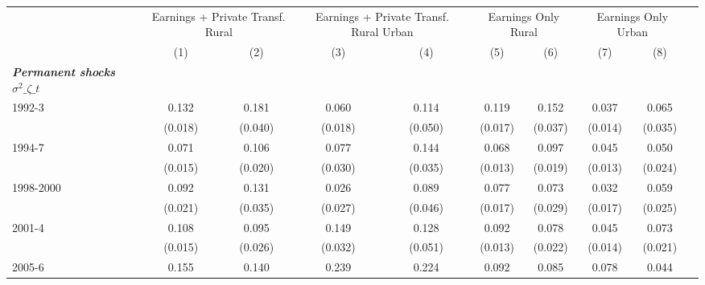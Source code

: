 \begin{tabular}{l*{10}{c}} \toprule
                    &            &\multicolumn{2}{c}{Earnings + Private Transf. Rural}&\multicolumn{2}{c}{Earnings + Private Transf. Rural Urban}&\multicolumn{2}{c}{Earnings Only Rural}&\multicolumn{2}{c}{Earnings Only Urban}\\\cmidrule{3-4}\cmidrule{5-6}\cmidrule{7-8}\cmidrule{9-10}
                    &            &\multicolumn{1}{c}{(1)}&\multicolumn{1}{c}{(2)}&\multicolumn{1}{c}{(3)}&\multicolumn{1}{c}{(4)}&\multicolumn{1}{c}{(5)}&\multicolumn{1}{c}{(6)}&\multicolumn{1}{c}{(7)}&\multicolumn{1}{c}{(8)}\\
\midrule
\textbf{\emph{Permanent shocks $\sigma^2\_{\zeta\_t}$}}&            &            &            &            &            &            &            &            &            \\
\hspace{.3cm} 1992-3&            &       0.132&       0.181&       0.060&       0.114&       0.119&       0.152&       0.037&       0.065\\
                    &            &     (0.018)&     (0.040)&     (0.018)&     (0.050)&     (0.017)&     (0.037)&     (0.014)&     (0.035)\\
\hspace{.3cm} 1994-7&            &       0.071&       0.106&       0.077&       0.144&       0.068&       0.097&       0.045&       0.050\\
                    &            &     (0.015)&     (0.020)&     (0.030)&     (0.035)&     (0.013)&     (0.019)&     (0.013)&     (0.024)\\
\hspace{.3cm} 1998-2000&            &       0.092&       0.131&       0.026&       0.089&       0.077&       0.073&       0.032&       0.059\\
                    &            &     (0.021)&     (0.035)&     (0.027)&     (0.046)&     (0.017)&     (0.029)&     (0.017)&     (0.025)\\
\hspace{.3cm} 2001-4&            &       0.108&       0.095&       0.149&       0.128&       0.092&       0.078&       0.045&       0.073\\
                    &            &     (0.015)&     (0.026)&     (0.032)&     (0.051)&     (0.013)&     (0.022)&     (0.014)&     (0.021)\\
\hspace{.3cm} 2005-6&            &       0.155&       0.140&       0.239&       0.224&       0.092&       0.085&       0.078&       0.044\\

\end{tabular}
